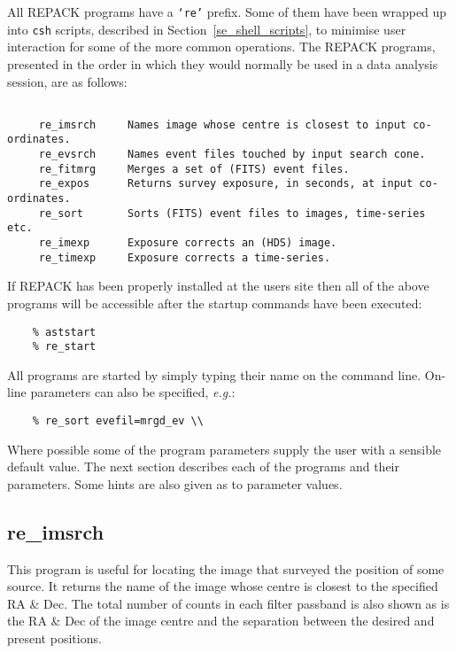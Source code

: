 All REPACK programs have a {\tt `re'} prefix.  Some of them have been
wrapped up into {\tt csh} scripts, described in
Section~\ref{se_shell_scripts}, to minimise user interaction for some
of the more common operations.  The REPACK programs, presented in the
order in which they would normally be used in a data analysis session,
are as follows:

\begin{verbatim}

     re_imsrch     Names image whose centre is closest to input co-ordinates.
     re_evsrch     Names event files touched by input search cone.
     re_fitmrg     Merges a set of (FITS) event files.
     re_expos      Returns survey exposure, in seconds, at input co-ordinates.
     re_sort       Sorts (FITS) event files to images, time-series etc.
     re_imexp      Exposure corrects an (HDS) image.
     re_timexp     Exposure corrects a time-series.

\end{verbatim}

If REPACK has been properly installed at the users site then all of the
above programs will be accessible after the startup commands have been
executed:

\begin{verbatim}
    % aststart
    % re_start
\end{verbatim}

All programs are started by simply typing their name on the command line.
On-line parameters can also be specified, \emph{e.g.}:

\begin{verbatim}
    % re_sort evefil=mrgd_ev \\
\end{verbatim}

Where possible some of the program parameters supply the user with a
sensible default value.  The next section describes each of the
programs and their parameters.  Some hints are also given as to
parameter values.

\subsection{\label{ss_re_imsrch}re\_imsrch}

This program is useful for locating the image that surveyed the
position of some source.  It returns the name of the image whose centre
is closest to the specified RA \& Dec.  The total number of counts in
each filter passband is also shown as is the RA \& Dec of the image
centre and the separation between the desired and present positions.

